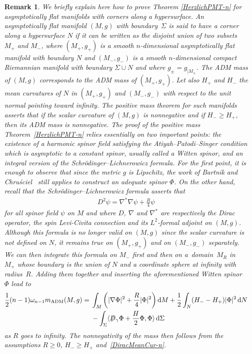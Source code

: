 \documentclass[pdftex]{sigma}
\numberwithin{equation}{section}
\newtheorem{Remark}[Theorem]{Remark}
\def\D{D\!\!\!\!/\,}
\begin{document}
\begin{Remark}\label{SpinBoundaryCorner}
We briefly explain here how to prove Theorem \ref{HerzlichPMT-n} for asymptotically flat manifolds with corners along a hypersurface. An asymptotically flat manifold $(M,g)$ with boundary~$\Sigma$ is said to have a corner along a hypersurface $N$ if it can be written as the disjoint union of two subsets $M_+$ and $M_-$, where $(M_+,g_{+})$ is a smooth $n$-dimensional asymptotically flat manifold with boundary $N$ and $(M_-,g_-)$ is a smooth $n$-dimensional compact Riemannian manifold with boundary $\Sigma\cup N$ and where $g_\pm=g_{|M_\pm}$. The ADM mass of $(M,g)$ corresponds to the ADM mass of $(M_+,g_+)$. Let also $H_+$ and $H_-$ the mean curvatures of $N$ in $(M_+,g_+)$ and $(M_-,g_-)$ with respect to the unit normal pointing toward infinity. The positive mass theorem for such manifolds asserts that if the scalar curvature of $(M,g)$ is nonnegative and if $H_-\geq H_+$, then its ADM mass is nonnegative. The proof of the positive mass Theorem~\ref{HerzlichPMT-n} relies essentially on two important points: the existence of a harmonic spinor field satisfying the Atiyah--Patodi--Singer condition which is asymptotic to a constant spinor, usually called a Witten spinor, and an integral version of the Schr\"odinger--Lichnerowicz formula. For the first point, it is enough to observe that since the metric $g$ is Lipschitz, the work of Bartnik and Chru\'sciel~\cite{BartnikChrusciel} still applies to construct an adequate spinor $\Phi$. On the other hand, recall that the Schr\"odinger--Lichnerowicz formula asserts that
\begin{gather*}%
D^2\psi=\nabla^*\nabla\psi+\frac{R}{4}\psi
\end{gather*}
for all spinor field $\psi$ on $M$ and where $D$, $\nabla$ and $\nabla^\ast$ are respectively the Dirac operator, the spin Levi-Civita connection and its $L^2$-formal adjoint on $(M,g)$. Although this formula is no longer valid on $(M,g)$ since the scalar curvature is not defined on $N$, it remains true on $(M_+,g_+)$ and on $(M_-,g_-)$ separately. We can then integrate this formula on $M_-$ first and then on a~domain~$M_R$ in~$M_+$ whose boundary is the union of $N$ and a coordinate sphere at infinity with radius~$R$. Adding them together and inserting the aforementioned Witten spinor $\Phi$ lead to
\begin{align*}
\frac{1}{2}(n-1)\omega_{n-1}m_{\rm ADM}(M,g) ={} & \int_{M}\bigg(|\nabla\Phi|^2+\frac{R}{4}|\Phi|^2\bigg)\,{\rm d}M+\frac{1}{2}\int_N(H_--H_+)|\Phi|^2\,{\rm d}N
\\
& -\int_{\Sigma}\langle \D_\gamma\Phi+\frac{H}{2}\Phi,\Phi\rangle \,{\rm d}\Sigma
\end{align*}
as $R$ goes to infinity. The nonnegativity of the mass then follows from the assumptions $R\geq 0$, $H_-\geq H_+$ and~\eqref{DiracMeanCur-n}.
\end{Remark}
\end{document}
